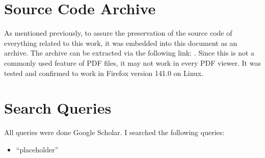 \documentclass[a4paper]{article}
\begin{document}


\listoftodos
\newpage

\tableofcontents
\newpage













\printbibliography

\appendix

\section{Source Code Archive}
As mentioned previously, to assure the preservation of the source code of everything related to this work, it was embedded into this document as an archive.
The archive can be extracted via the following link: .
Since this is not a commonly used feature of PDF files, it may not work in every PDF viewer.
It was tested and confirmed to work in Firefox version 141.0 on Linux.

\section{Search Queries}
\label{app:repro-search-queries}
All queries were done Google Scholar. I searched the following queries:
\begin{itemize}
    \item ``placeholder''
\end{itemize}

\end{document}
